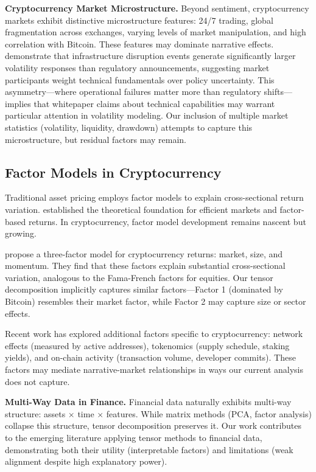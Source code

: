 \documentclass[11pt,twocolumn]{article}
\begin{document}
\textbf{Cryptocurrency Market Microstructure.} Beyond sentiment, cryptocurrency markets exhibit distinctive microstructure features: 24/7 trading, global fragmentation across exchanges, varying levels of market manipulation, and high correlation with Bitcoin. These features may dominate narrative effects. \citet{farzulla2025event} demonstrate that infrastructure disruption events generate significantly larger volatility responses than regulatory announcements, suggesting market participants weight technical fundamentals over policy uncertainty. This asymmetry---where operational failures matter more than regulatory shifts---implies that whitepaper claims about technical capabilities may warrant particular attention in volatility modeling. Our inclusion of multiple market statistics (volatility, liquidity, drawdown) attempts to capture this microstructure, but residual factors may remain.

\subsection{Factor Models in Cryptocurrency}

Traditional asset pricing employs factor models to explain cross-sectional return variation. \citet{fama1970efficient} established the theoretical foundation for efficient markets and factor-based returns. In cryptocurrency, factor model development remains nascent but growing.

\citet{liu2021risks} propose a three-factor model for cryptocurrency returns: market, size, and momentum. They find that these factors explain substantial cross-sectional variation, analogous to the Fama-French factors for equities. Our tensor decomposition implicitly captures similar factors---Factor 1 (dominated by Bitcoin) resembles their market factor, while Factor 2 may capture size or sector effects.

Recent work has explored additional factors specific to cryptocurrency: network effects (measured by active addresses), tokenomics (supply schedule, staking yields), and on-chain activity (transaction volume, developer commits). These factors may mediate narrative-market relationships in ways our current analysis does not capture.

\textbf{Multi-Way Data in Finance.} Financial data naturally exhibits multi-way structure: assets $\times$ time $\times$ features. While matrix methods (PCA, factor analysis) collapse this structure, tensor decomposition preserves it. Our work contributes to the emerging literature applying tensor methods to financial data, demonstrating both their utility (interpretable factors) and limitations (weak alignment despite high explanatory power).
\end{document}
